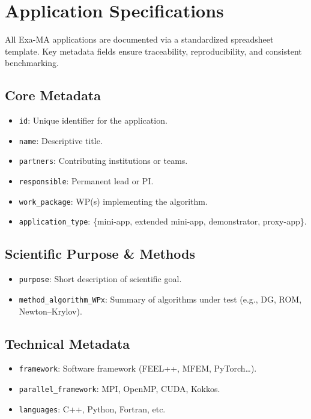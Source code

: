 \section{Application Specifications}
\label{sec:apps-specs}

All Exa-MA applications are documented via a standardized spreadsheet template. Key metadata fields ensure traceability, reproducibility, and consistent benchmarking.

\subsection{Core Metadata}
\begin{itemize}
  \item \texttt{id}: Unique identifier for the application.  
  \item \texttt{name}: Descriptive title.  
  \item \texttt{partners}: Contributing institutions or teams.  
  \item \texttt{responsible}: Permanent lead or PI.  
  \item \texttt{work\_package}: WP(s) implementing the algorithm.  
  \item \texttt{application\_type}: \{mini-app, extended mini-app, demonstrator, proxy-app\}.
\end{itemize}

\subsection{Scientific Purpose \& Methods}
\begin{itemize}
  \item \texttt{purpose}: Short description of scientific goal.  
  \item \texttt{method\_algorithm\_WPx}: Summary of algorithms under test (e.g., DG, ROM, Newton–Krylov).
\end{itemize}

\subsection{Technical Metadata}
\begin{itemize}
  \item \texttt{framework}: Software framework (FEEL++, MFEM, PyTorch…).  
  \item \texttt{parallel\_framework}: MPI, OpenMP, CUDA, Kokkos.  
  \item \texttt{languages}: C++, Python, Fortran, etc.
\end{itemize}

